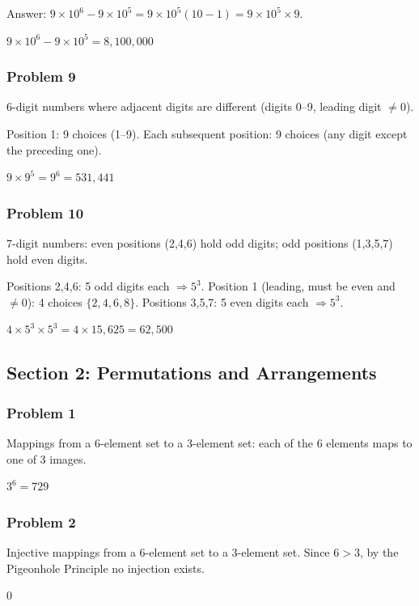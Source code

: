 Answer: $9\times 10^6 - 9\times 10^5 = 9\times 10^5(10-1)=9\times 10^5\times 9$.

$\boxed{9\times 10^6 - 9\times 10^5 = 8{,}100{,}000}$

\subsubsection*{Problem 9}
6-digit numbers where adjacent digits are different (digits 0--9, leading digit $\neq 0$).

Position 1: 9 choices (1--9). Each subsequent position: 9 choices (any digit except the preceding one).

$\boxed{9 \times 9^5 = 9^6 = 531{,}441}$

\subsubsection*{Problem 10}
7-digit numbers: even positions (2,4,6) hold odd digits; odd positions (1,3,5,7) hold even digits.

Positions 2,4,6: 5 odd digits each $\Rightarrow 5^3$.
Position 1 (leading, must be even and $\neq 0$): 4 choices $\{2,4,6,8\}$.
Positions 3,5,7: 5 even digits each $\Rightarrow 5^3$.

$\boxed{4 \times 5^3 \times 5^3 = 4 \times 15{,}625 = 62{,}500}$

\subsection*{Section 2: Permutations and Arrangements}

\subsubsection*{Problem 1}
Mappings from a 6-element set to a 3-element set: each of the 6 elements maps to one of 3 images.

$\boxed{3^6 = 729}$

\subsubsection*{Problem 2}
Injective mappings from a 6-element set to a 3-element set.
Since $6 > 3$, by the Pigeonhole Principle no injection exists.

$\boxed{0}$

